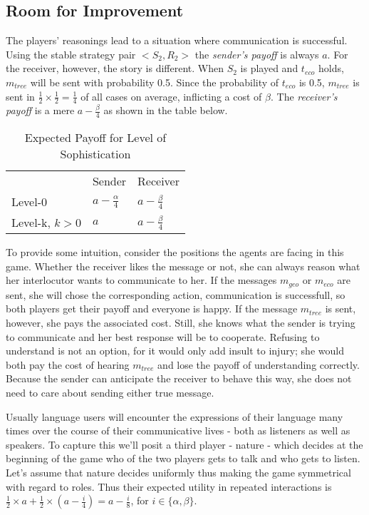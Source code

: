 \documentclass[10pt]{article}
\begin{document}
\subsection{Room for Improvement}
The players' reasonings lead to a situation where communication is successful. Using the stable strategy pair $<S_2,R_2>$ the \textit{sender's payoff} is always $a$. For the receiver, however, the story is different. When $S_2$ is played and $t_{eco}$ holds, $m_{tree}$ will be sent with probability 0.5. Since the probability of $t_{eco}$ is 0.5, $m_{tree}$ is sent in $\tfrac{1}{2}\times \tfrac{1}{2} = \tfrac{1}{4}$ of all cases on average, inflicting a cost of $\beta$. The \textit{receiver's payoff} is a mere $a-\tfrac{\beta}{4}$ as shown in the table below.

\begin{table}[h]
\centering
\caption{Expected Payoff for Level of Sophistication}
\begin{tabular}{lll}
                                    & Sender                                  & Receiver                                \\ \cline{2-3}
\multicolumn{1}{l|}{Level-0}        & \multicolumn{1}{l|}{$a-\tfrac{\alpha}{4}$} & \multicolumn{1}{l|}{$a-\tfrac{\beta}{4}$} \\ \cline{2-3}
\multicolumn{1}{l|}{Level-k, $k>0$} & \multicolumn{1}{l|}{$a$}                  & \multicolumn{1}{l|}{$a-\tfrac{\beta}{4}$} \\ \cline{2-3}
\end{tabular}
\end{table}
To provide some intuition, consider the positions the agents are facing in this game. Whether the receiver likes the message or not, she can always reason what her interlocutor wants to communicate to her. If the messages $m_{geo}$ or $m_{eco}$ are sent, she will chose the corresponding action, communication is successfull, so both players get their payoff and everyone is happy. If the message $m_{tree}$ is sent, however, she pays the associated cost. Still, she knows what the sender is trying to communicate and her best response will be to cooperate. Refusing to understand is not an option, for it would only add insult to injury; she would both pay the cost of hearing $m_{tree}$ and lose the payoff of understanding correctly. Because the sender can anticipate the receiver to behave this way, she does not need to care about sending either true message.

Usually language users will encounter the expressions of their language many times over the course of their communicative lives - both as listeners as well as speakers. To capture this we'll posit a third player - nature - which decides at the beginning of the game who of the two players gets to talk and who gets to listen. Let's assume that nature decides uniformly thus making the game symmetrical with regard to roles. Thus their expected utility in repeated interactions is $\tfrac{1}{2}\times a + \tfrac{1}{2}\times (a-\tfrac{i}{4})=a-\tfrac{i}{8}$, for $i\in \{\alpha,\beta \}$.
\end{document}
